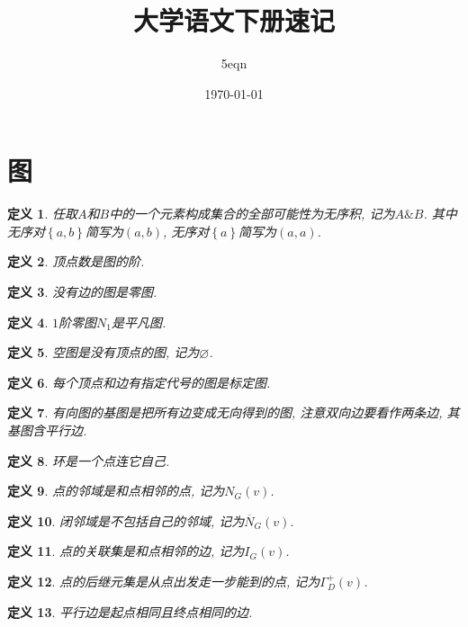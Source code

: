 \documentclass[UTF8,a4paper,11pt]{ctexart}
\title{大学语文下册速记}
\author{5eqn}
\date{\today}
\newtheorem{definition}{定义}
\begin{document}
  \maketitle
  \section{图}
    \begin{definition}
      任取$A$和$B$中的一个元素构成集合的全部可能性为无序积,
      记为$A\&B$. 其中无序对$\left\{a,b\right\}$简写为$\left(a,b\right)$,
      无序对$\left\{a\right\}$简写为$\left(a,a\right)$.
    \end{definition}
    \begin{definition}
      顶点数是图的阶.
    \end{definition}
    \begin{definition}
      没有边的图是零图.
    \end{definition}
    \begin{definition}
      $1$阶零图$N_1$是平凡图.
    \end{definition}
    \begin{definition}
      空图是没有顶点的图, 记为$\varnothing$.
    \end{definition}
    \begin{definition}
      每个顶点和边有指定代号的图是标定图.
    \end{definition}
    \begin{definition}
      有向图的基图是把所有边变成无向得到的图,
      注意双向边要看作两条边, 其基图含平行边.
    \end{definition}
    \begin{definition}
      环是一个点连它自己.
    \end{definition}
    \begin{definition}
      点的邻域是和点相邻的点, 记为$N_G\left(v\right)$.
    \end{definition}
    \begin{definition}
      闭邻域是不包括自己的邻域, 记为$\overline{N}_G\left(v\right)$.
    \end{definition}
    \begin{definition}
      点的关联集是和点相邻的边, 记为$I_G\left(v\right)$.
    \end{definition}
    \begin{definition}
      点的后继元集是从点出发走一步能到的点, 记为$\Gamma^{+}_D\left(v\right)$.
    \end{definition}
    \begin{definition}
      平行边是起点相同且终点相同的边.
    \end{definition}
\end{document}

